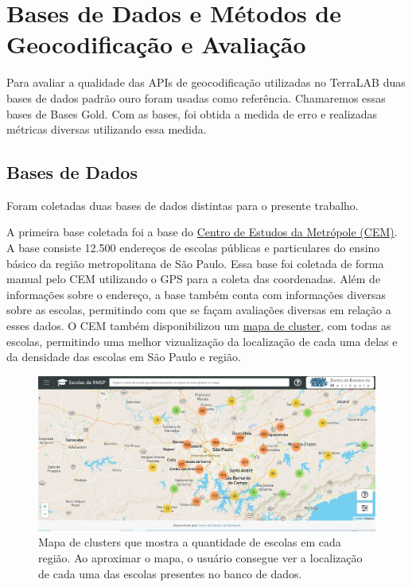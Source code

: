 \chapter{Bases de Dados e Métodos de Geocodificação e Avaliação} \label{desenvolvimento}


Para avaliar a qualidade das APIs de geocodificação utilizadas no TerraLAB duas bases de dados padrão ouro foram usadas como referência. Chamaremos essas bases de Bases Gold. Com as bases, foi obtida a medida de erro e realizadas métricas diversas utilizando essa medida.


\section{Bases de Dados}
Foram coletadas duas bases de dados distintas para o presente trabalho.

A primeira base coletada foi a base do \href{https://centrodametropole.fflch.usp.br/pt-br}{Centro de Estudos da Metrópole (CEM)}. A base consiste 12.500 endereços de escolas públicas e particulares do ensino básico da região metropolitana de São Paulo. Essa base foi coletada de forma manual pelo CEM utilizando o GPS para a coleta das coordenadas. Além de informações sobre o endereço, a base também conta com informações diversas sobre as escolas, permitindo com que se façam avaliações diversas em relação a esses dados. O CEM também disponibilizou um \href{http://200.144.244.241:3002/geolocation}{mapa de cluster}, com todas as escolas, permitindo uma melhor vizualização da localização de cada uma delas e da densidade das escolas em São Paulo e região.

\begin{figure} 
    \centering
    \includegraphics[width=\textwidth]{Figuras/siteCEM.jpeg}
    \caption{Mapa de clusters que mostra a quantidade de escolas em cada região. Ao aproximar o mapa, o usuário consegue ver a localização de cada uma das escolas presentes no banco de dados.}
    \label{fig:siteCEM}
\end{figure}

